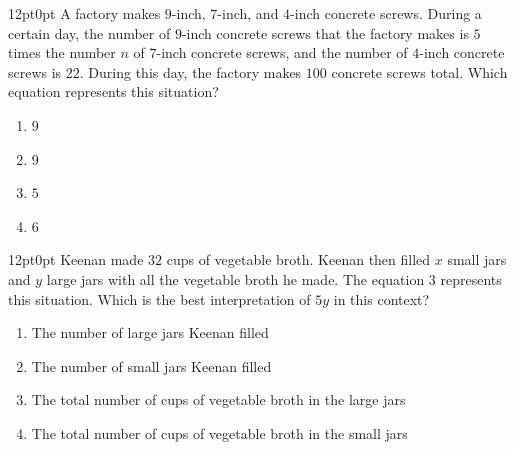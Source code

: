 \documentclass[11pt, twocolumn]{article}
\newcounter{questionnum}
\begin{document}
\vspace{6pt}\noindent
\begin{minipage}{\columnwidth}\raggedright
\noindent{}\par\vspace{8pt}
\begin{adjustwidth}{12pt}{0pt}
A factory makes $9$-inch, $7$-inch, and $4$-inch concrete screws. During a certain day, the number of $9$-inch concrete screws that the factory makes is $5$ times the number $n$ of $7$-inch concrete screws, and the number of $4$-inch concrete screws is $22$. During this day, the factory makes $100$ concrete screws total. Which equation represents this situation?
\begin{enumerate}[label=\Alph*),leftmargin=18pt,topsep=3pt,itemsep=2pt]
  \item $9$
  \item $9$
  \item $5$
  \item $6$
\end{enumerate}
\end{adjustwidth}
\end{minipage}\par

\vspace{6pt}\noindent
\begin{minipage}{\columnwidth}\raggedright
\noindent{}\par\vspace{8pt}
\begin{adjustwidth}{12pt}{0pt}
Keenan made $32$ cups of vegetable broth. Keenan then filled $x$ small jars and $y$ large jars with all the vegetable broth he made. The equation $3$ represents this situation. Which is the best interpretation of $5 y$ in this context?
\begin{enumerate}[label=\Alph*),leftmargin=18pt,topsep=3pt,itemsep=2pt]
  \item The number of large jars Keenan filled
  \item The number of small jars Keenan filled
  \item The total number of cups of vegetable broth in the large jars
  \item The total number of cups of vegetable broth in the small jars
\end{enumerate}
\end{adjustwidth}
\end{minipage}\par
\end{document}
